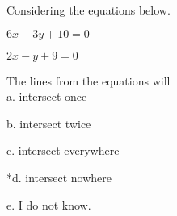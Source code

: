 
Considering the equations below.

\(6x - 3y + 10 = 0\)

\(2x - y + 9 = 0\)

The lines from the equations will\\

a. intersect once

b. intersect twice

c. intersect everywhere

*d. intersect nowhere

e. I do not know.\\
